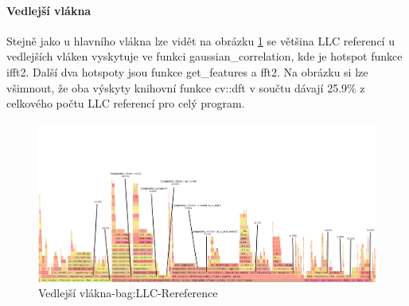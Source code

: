 \documentclass{article}
\begin{document}
\paragraph{Vedlejší vlákna}
Stejně jako u hlavního vlákna lze vidět na obrázku \ref{LLC-References-threads} se většina LLC referencí u vedlejších vláken vyskytuje ve funkci gaussian\_correlation, kde je hotspot funkce ifft2. Další dva hotspoty jsou funkce get\_features a fft2. Na obrázku si lze všimnout, že oba výskyty knihovní funkce cv::dft v součtu dávají 25.9\% z celkového počtu LLC referencí pro celý program.
\begin{figure}[h!]
	\centering
	\includegraphics[width=\linewidth]{Perf/Bag/LLC-References-bag-closeup-threads-gimp.png}
	\caption{Vedlejší vlákna-bag:LLC-Rereference}
	\label{LLC-References-threads}
\end{figure}
\newpage
\end{document}
